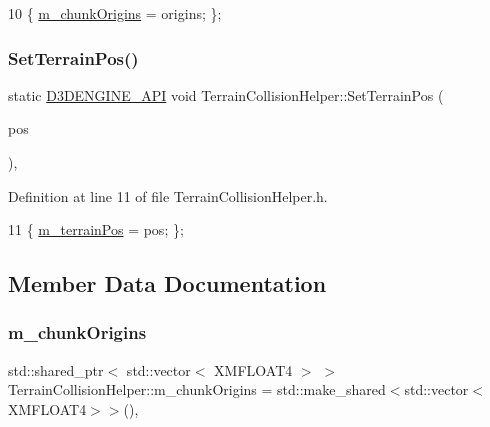 \begin{DoxyCode}
10 \{ \mbox{\hyperlink{class_terrain_collision_helper_a49449b3d4ccf601ddca4200b5aa39b85}{m\_chunkOrigins}} = origins; \};
\end{DoxyCode}
\mbox{\label{class_terrain_collision_helper_abebaf2ed1b6534d1f6b1a42eb6e7ab6f}} 
\subsubsection{\texorpdfstring{Set\+Terrain\+Pos()}{SetTerrainPos()}}
{\footnotesize\ttfamily static \mbox{\hyperlink{stdafx_8h_a8ee2d990c5dfba7794dd2b60741d7722}{D3\+D\+E\+N\+G\+I\+N\+E\+\_\+\+A\+PI}} void Terrain\+Collision\+Helper\+::\+Set\+Terrain\+Pos (\begin{DoxyParamCaption}\item[{X\+M\+F\+L\+O\+A\+T3}]{pos }\end{DoxyParamCaption})\hspace{0.3cm}{\ttfamily [inline]}, {\ttfamily [static]}}



Definition at line 11 of file Terrain\+Collision\+Helper.\+h.


\begin{DoxyCode}
11 \{ \mbox{\hyperlink{class_terrain_collision_helper_a6525b9bf4cf6d93fe66d87fff5a70aa3}{m\_terrainPos}} = pos; \};
\end{DoxyCode}


\subsection{Member Data Documentation}
\mbox{\label{class_terrain_collision_helper_a49449b3d4ccf601ddca4200b5aa39b85}} 
\subsubsection{\texorpdfstring{m\+\_\+chunk\+Origins}{m\_chunkOrigins}}
{\footnotesize\ttfamily std\+::shared\+\_\+ptr$<$ std\+::vector$<$ X\+M\+F\+L\+O\+A\+T4 $>$ $>$ Terrain\+Collision\+Helper\+::m\+\_\+chunk\+Origins = std\+::make\+\_\+shared$<$std\+::vector$<$X\+M\+F\+L\+O\+A\+T4$>$$>$()\hspace{0.3cm}{\ttfamily [static]}, {\ttfamily [private]}}



